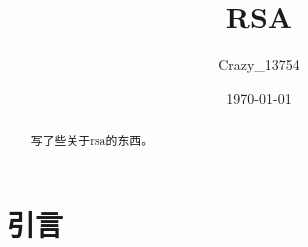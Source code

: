 \documentclass[a4paper]{article}  %
\title{\heiti\zihao{2} RSA}
\author{\songti Crazy\_13754}
\date{\today}
\newcommand{\upcite}[1]{\textsuperscript{\textsuperscript{\cite{#1}}}} %
\begin{document}
\maketitle
\begin{abstract}
	写了些关于rsa的东西。
\end{abstract}
\tableofcontents
\section[引言]{引言}






\end{document}
